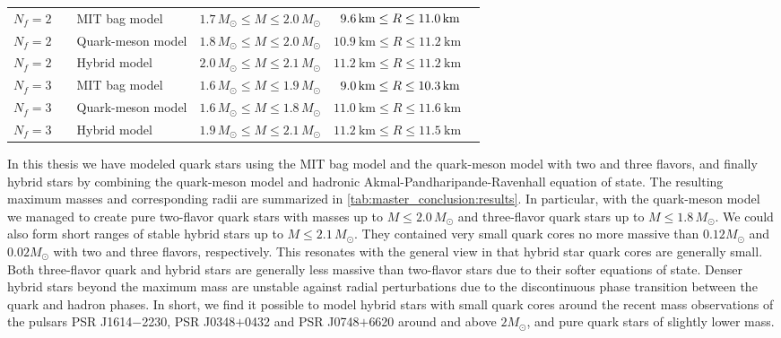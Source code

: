 \begin{table}[b!]
{\begin{tabular}{ c l l c c c }
	$N_f=2$ & \Cref{chap:mit} & MIT bag model & $1.7 \, M_\odot \leq M \leq 2.0 \, M_\odot$ & $\hphantom{1}\SI{9.6}{\kilo\meter} \leq R \leq \SI{11.0}{\kilo\meter}$ \\
	$N_f=2$ & \Cref{chap:lsm2f} & Quark-meson model & $1.8 \, M_\odot \leq M \leq 2.0 \, M_\odot$ & $\SI{10.9}{\kilo\meter} \leq R \leq \SI{11.2}{\kilo\meter}$ \\
	$N_f=2$ & \Cref{chap:hybrid} & Hybrid model & $2.0 \, M_\odot \leq M \leq 2.1 \, M_\odot$ & $\SI{11.2}{\kilo\meter} \leq R \leq \SI{11.2}{\kilo\meter}$ \\
	\midrule
	$N_f=3$ & \Cref{chap:mit} & MIT bag model & $1.6 \, M_\odot \leq M \leq 1.9 \, M_\odot$ & $\hphantom{1}\SI{9.0}{\kilo\meter} \leq R \leq \SI{10.3}{\kilo\meter}$ \\
	$N_f=3$ & \Cref{chap:lsm3f} & Quark-meson model & $1.6 \, M_\odot \leq M \leq 1.8 \, M_\odot$ & $\SI{11.0}{\kilo\meter} \leq R \leq \SI{11.6}{\kilo\meter}$ \\
	$N_f=3$ & \Cref{chap:hybrid} & Hybrid model & $1.9 \, M_\odot \leq M \leq 2.1 \, M_\odot$ & $\SI{11.2}{\kilo\meter} \leq R \leq \SI{11.5}{\kilo\meter}$ \\
	\bottomrule
\end{tabular}}
\end{table}

In this thesis we have modeled quark stars using the MIT bag model and the quark-meson model with two and three flavors,
and finally hybrid stars by combining the quark-meson model and hadronic Akmal-Pandharipande-Ravenhall equation of state.
The resulting maximum masses and corresponding radii are summarized in \cref{tab:master_conclusion:results}.
In particular, with the quark-meson model we managed to create pure two-flavor quark stars with masses up to $M \leq 2.0 \, M_\odot$ and three-flavor quark stars up to $M \leq 1.8 \, M_\odot$.
We could also form short ranges of stable hybrid stars up to $M \leq 2.1 \, M_\odot$.
They contained very small quark cores no more massive than $0.12 M_\odot$ and $0.02 M_\odot$ with two and three flavors, respectively.
This resonates with the general view in \cite{ref:quark_star_review} that hybrid star quark cores are generally small.
Both three-flavor quark and hybrid stars are generally less massive than two-flavor stars due to their softer equations of state.
Denser hybrid stars beyond the maximum mass are unstable against radial perturbations due to the discontinuous phase transition between the quark and hadron phases.
In short, we find it possible to model hybrid stars with small quark cores around the recent mass observations of the pulsars PSR J1614$-$2230, PSR J0348$+$0432 and PSR J0748$+$6620 around and above $2 M_\odot$,
and pure quark stars of slightly lower mass.

